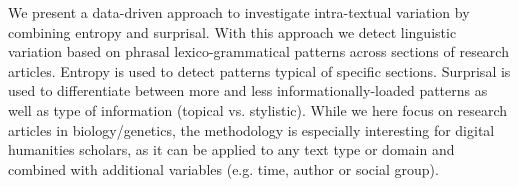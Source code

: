 We present a data-driven approach to investigate intra-textual variation by combining entropy and surprisal. With this approach we detect linguistic variation based on phrasal lexico-grammatical patterns across sections of research articles. Entropy is used to detect patterns typical of specific sections. Surprisal is used to differentiate between more and less informationally-loaded patterns as well as type of information (topical vs. stylistic). While we here focus on research articles in biology/genetics, the methodology is especially interesting for digital humanities scholars, as it can be applied to any text type or domain and combined with additional variables (e.g. time, author or social group).

